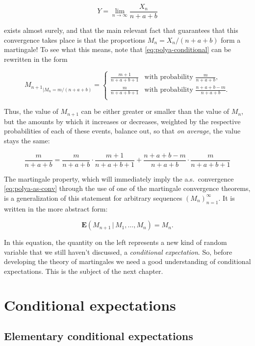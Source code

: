 \documentclass[11pt]{report}
\theoremstyle{plain}
\theoremstyle{definition}
\begin{document}
\begin{equation*} \tag{4}\label{eq:polya-as-conv}
Y = \lim_{n\to\infty} \frac{X_n}{n+a+b}
\end{equation*}

\noindent exists almost surely, and that the main relevant fact
that guarantees that this convergence takes place is
that the proportions $M_n = X_n/(n+a+b)$ form a
martingale! To see what this means, note that
\eqref{eq:polya-conditional} can be rewritten in the form

\[
{M_{n+1}}_{\big| M_n = m/(n+a+b)} =
\begin{cases}
\frac{m+1}{n+a+b+1} & \textrm{with probability }\frac{m}{n+a+b}, \\
\frac{m}{n+a+b+1} & \textrm{with probability }\frac{n+a+b-m}{n+a+b}. \\
\end{cases}
\]

\noindent Thus, the value of $M_{n+1}$ can be either greater or
smaller than the value of $M_n$, but the amounts by
which it increases or decreases, weighted by the
respective probabilities of each of these events,
balance out, so that \emph{on average}, the value stays the
same:

\[
\frac{m}{n+a+b} = \frac{m}{n+a+b}\cdot \frac{m+1}{n+a+b+1} +
\frac{n+a+b-m}{n+a+b} \cdot \frac{m}{n+a+b+1}
\]

\noindent The martingale property, which will immediately imply
the a.s.\ convergence \eqref{eq:polya-as-conv} through the
use of one of the martingale convergence theorems, is
a generalization of this statement for arbitrary
sequences $(M_n)_{n=1}^\infty$. It is written in the
more abstract form:

\[
\mathbf{E}\left(M_{n+1}\,|\,M_1,\ldots,M_n\right) = M_n.
\]

\noindent In this equation, the quantity on the left represents
a new kind of random variable that we still haven't
discussed, a \emph{conditional expectation}. So, before
developing the theory of martingales we need a good
understanding of conditional expectations. This is the
subject of the next chapter.

\chapter{Conditional expectations}

\section{Elementary conditional expectations}
\end{document}

